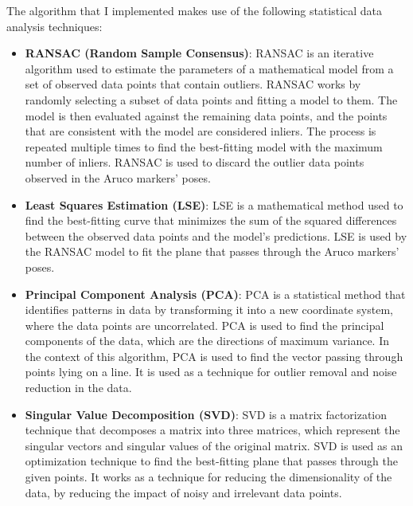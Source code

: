 The algorithm that I implemented makes use of the following statistical data analysis techniques:

\begin{itemize}
    \item \textbf{RANSAC (Random Sample Consensus)}: RANSAC is an iterative algorithm used to estimate
    the parameters of a mathematical model from a set of observed data points that contain outliers.
    RANSAC works by randomly selecting a subset of data points and fitting a model to them. The model is then
    evaluated against the remaining data points, and the points that are consistent with the model are considered
    inliers. The process is repeated multiple times to find the best-fitting model with the maximum number of inliers.
    RANSAC is used to discard the outlier data points observed in the Aruco markers' poses.
    \item \textbf{Least Squares Estimation (LSE)}: LSE is a mathematical method used to find the best-fitting curve
    that minimizes the sum of the squared differences between the observed data points and the model's predictions.
    LSE is used by the RANSAC model to fit the plane that passes through the Aruco markers' poses.
    \item \textbf{Principal Component Analysis (PCA)}: PCA is a statistical method that identifies patterns
    in data by transforming it into a new coordinate system, where the data points are uncorrelated.
    PCA is used to find the principal components of the data, which are the directions of maximum variance.
    In the context of this algorithm, PCA is used to find the vector passing through points lying on a line.
    It is used as a technique for outlier removal and noise reduction in the data.
    \item \textbf{Singular Value Decomposition (SVD)}: SVD is a matrix factorization technique that decomposes
    a matrix into three matrices, which represent the singular vectors and singular values of the original matrix.
    SVD is used as an optimization technique to find the best-fitting plane that passes through the given points.
    It works as a technique for reducing the dimensionality of the data, by reducing the impact of noisy
    and irrelevant data points.
\end{itemize}


